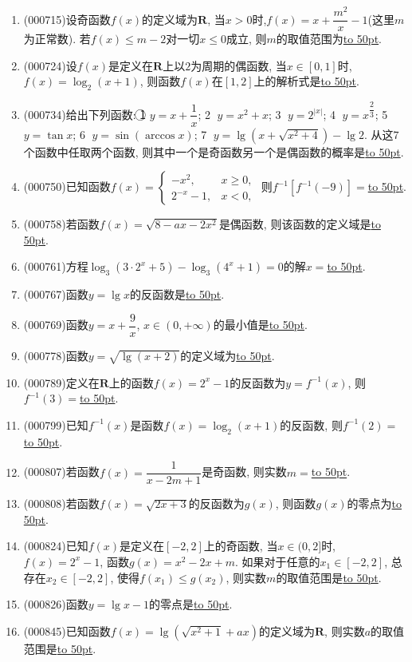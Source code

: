 \documentclass[10pt,a4paper]{article}
\newcommand{\blank}[1]{\underline{\hbox to #1pt{}}}
\begin{document}
\begin{enumerate}[1.]
\item {\tiny (000715)}设奇函数$f(x)$的定义域为$\mathbf{R}$, 当$x>0$时,$f(x)=x+\dfrac{m^2}x-1$(这里$m$为正常数). 若$f(x)\le m-2$对一切$x\le 0$成立, 则$m$的取值范围为\blank{50}.
\item {\tiny (000724)}设$f(x)$是定义在$\mathbf{R}$上以$2$为周期的偶函数, 当$x\in [0,1]$时, $f(x)=\log_2(x+1)$, 则函数$f(x)$在$[1,2]$上的解析式是\blank{50}.
\item {\tiny (000734)}给出下列函数: \textcircled{1} $y=x+\dfrac1x$; \textcircled{2} $y={x^2}+x$; \textcircled{3} $y={2^{|x|}}$; \textcircled{4} $y={x^{\dfrac23}}$; \textcircled{5} $y=\tan x$; \textcircled{6} $y=\sin(\arccos x)$; \textcircled{7} $y=\lg(x+\sqrt{{x^2}+4})-\lg 2$. 从这$7$个函数中任取两个函数, 则其中一个是奇函数另一个是偶函数的概率是\blank{50}.
\item {\tiny (000750)}已知函数$f(x)=\begin{cases} -x^2, & x\ge 0,  \\2^{-x}-1, & x<0, \end{cases}$ 则$f^{-1}[f^{-1}(-9)]=$\blank{50}.
\item {\tiny (000758)}若函数$f(x)=\sqrt{8-ax-2x^2}$是偶函数, 则该函数的定义域是\blank{50}.
\item {\tiny (000761)}方程$\log_3(3 \cdot 2^x+5)-\log_3(4^x+1)=0$的解$x=$\blank{50}.
\item {\tiny (000767)}函数$y=\lg x$的反函数是\blank{50}.
\item {\tiny (000769)}函数$y=x+\dfrac9x$, $x\in (0,+\infty)$的最小值是\blank{50}.
\item {\tiny (000778)}函数$y=\sqrt{\lg(x+2)}$的定义域为\blank{50}.
\item {\tiny (000789)}定义在$\mathbf{R}$上的函数$f(x)=2^x-1$的反函数为$y=f^{-1}(x)$, 则$f^{-1}(3)=$\blank{50}.
\item {\tiny (000799)}已知$f^{-1}(x)$是函数$f(x)=\log_2(x+1)$的反函数, 则$f^{-1}(2)=$\blank{50}.
\item {\tiny (000807)}若函数$f(x)=\dfrac1{x-2m+1}$是奇函数, 则实数$m=$\blank{50}.
\item {\tiny (000808)}若函数$f(x)=\sqrt{2x+3}$的反函数为$g(x)$, 则函数$g(x)$的零点为\blank{50}.
\item {\tiny (000824)}已知$f(x)$是定义在$[-2,2]$上的奇函数, 当$x\in (0,2]$时,$f(x)=2^x-1$, 函数$g(x)=x^2-2x+m$. 如果对于任意的$x_1\in [-2,2]$, 总存在$x_2\in [-2,2]$, 使得$f(x_1)\le g(x_2)$, 则实数$m$的取值范围是\blank{50}.
\item {\tiny (000826)}函数$y=\lg x-1$的零点是\blank{50}.
\item {\tiny (000845)}已知函数$f(x)=\lg (\sqrt{x^2+1}+ax)$的定义域为$\mathbf{R}$, 则实数$a$的取值范围是\blank{50}.

\end{enumerate}
\end{document}
